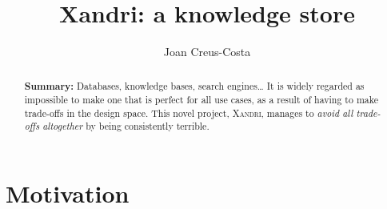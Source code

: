 \documentclass[11pt,justified]{tufte-handout}
\title{{Xandri: a knowledge store}}
\author{\normalsize Joan Creus-Costa}
\date{}
\begin{document}
\maketitle

\begin{abstract}
\textbf{Summary:} Databases, knowledge bases, search engines\dots{} It is widely regarded as impossible to make one that is perfect for all use cases, as a result of having to make trade-offs in the design space. This novel project, \textsc{Xandri}, manages to \emph{avoid all trade-offs altogether} by being consistently terrible.
\end{abstract}

\section{Motivation}
\end{document}
